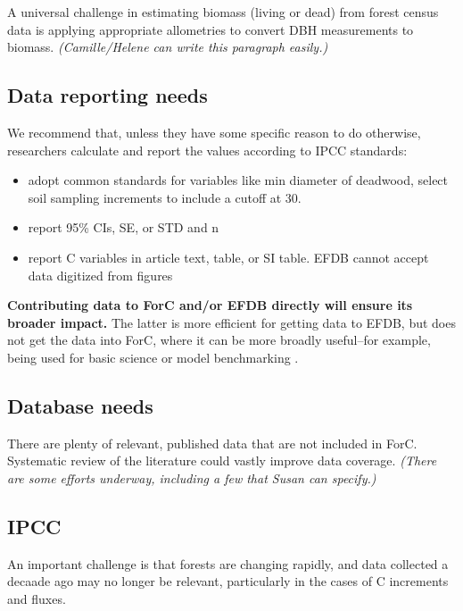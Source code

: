 \documentclass[, manuscript]{copernicus}
\begin{document}
A universal challenge in estimating biomass (living or dead) from forest
census data is applying appropriate allometries to convert DBH
measurements to biomass. \emph{(Camille/Helene can write this paragraph
easily.)}

\subsection{Data reporting needs}

We recommend that, unless they have some specific reason to do
otherwise, researchers calculate and report the values according to IPCC
standards:

\begin{itemize}
\item
  adopt common standards for variables like min diameter of deadwood,
  select soil sampling increments to include a cutoff at 30.
\item
  report 95\% CIs, SE, or STD and n
\item
  report C variables in article text, table, or SI table. EFDB cannot
  accept data digitized from figures
\end{itemize}

\textbf{Contributing data to ForC and/or EFDB directly will ensure its
broader impact.} The latter is more efficient for getting data to EFDB,
but does not get the data into ForC, where it can be more broadly
useful--for example, being used for basic science
\citep[e.g.,][]{banburymorgan_global_2021, anderson-teixeira_carbon_2021}
or model benchmarking \citep{fer_ecosystem_2021}.

\subsection{Database needs}

There are plenty of relevant, published data that are not included in
ForC. Systematic review of the literature could vastly improve data
coverage. \emph{(There are some efforts underway, including a few that
Susan can specify.)}

\subsection{IPCC}

An important challenge is that forests are changing rapidly, and data
collected a decaade ago may no longer be relevant, particularly in the
cases of C increments and fluxes.
\end{document}
